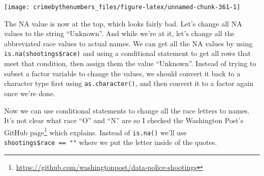 \documentclass[
]{krantz}
\makeatletter
\newenvironment{Shaded}{\begin{snugshade}}{\end{snugshade}}
\newcommand{\FunctionTok}[1]{\textcolor[rgb]{0,0,0}{#1}}
\newcommand{\NormalTok}[1]{#1}
\newcommand{\OtherTok}[1]{\textcolor[rgb]{0.37,0.37,0.37}{#1}}
\newcommand{\SpecialCharTok}[1]{\textcolor[rgb]{0,0,0}{#1}}
\newcommand{\StringTok}[1]{\textcolor[rgb]{0.5,0.5,0.5}{#1}}
\renewcommand{\href}[2]{#2\footnote{\url{#1}}}
\newenvironment{kframe}{%
\medskip{}
\setlength{\fboxsep}{.8em}
 \def\at@end@of@kframe{}%
 \ifinner\ifhmode%
  \def\at@end@of@kframe{\end{minipage}}%
  \begin{minipage}{\columnwidth}%
 \fi\fi%
 \def\FrameCommand##1{\hskip\@totalleftmargin \hskip-\fboxsep
 \colorbox{shadecolor}{##1}\hskip-\fboxsep
     \hskip-\linewidth \hskip-\@totalleftmargin \hskip\columnwidth}%
 \MakeFramed {\advance\hsize-\width
   \@totalleftmargin\z@ \linewidth\hsize
   \@setminipage}}%
 {\par\unskip\endMakeFramed%
 \at@end@of@kframe}
\renewenvironment{Shaded}{\begin{kframe}}{\end{kframe}}
\makeatother
\begin{document}
\begin{center}\texttt{[image: crimebythenumbers\_files/figure-latex/unnamed-chunk-361-1]} \end{center}

The NA value is now at the top, which looks fairly bad. Let's change all NA values to the string ``Unknown''. And while we're at it, let's change all the abbreviated race values to actual names. We can get all the NA values by using \texttt{is.na(shootings\$race)} and using a conditional statement to get all rows that meet that condition, then assign them the value ``Unknown''. Instead of trying to subset a factor variable to change the values, we should convert it back to a character type first using \texttt{as.character()}, and then convert it to a factor again once we're done.

\begin{Shaded}
\end{Shaded}

Now we can use conditional statements to change all the race letters to names. It's not clear what race ``O'' and ``N'' are so I checked the \href{https://github.com/washingtonpost/data-police-shootings}{Washington Post's GitHub page} which explains. Instead of \texttt{is.na()} we'll use \texttt{shootings\$race\ ==\ ""} where we put the letter inside of the quotes.

\begin{Shaded}
\end{Shaded}
\end{document}
